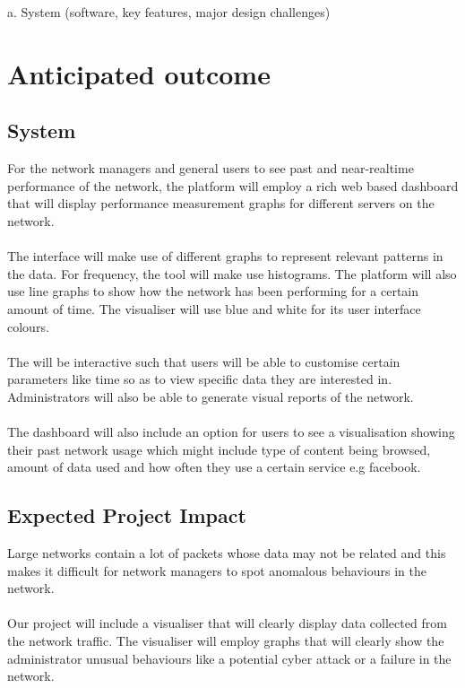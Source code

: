 a. System (software, key features, major design challenges) 

\section{Anticipated outcome}
\subsection{System}
For the network managers and general users to see past and near-realtime performance of the network, the platform will employ a rich web based dashboard that will display performance measurement graphs for different servers on the network.
\paragraph{}
The interface will make use of different graphs to represent relevant patterns in the data. For frequency, the tool will make use histograms. The platform will also use line graphs to show how the network has been performing for a certain amount of time. The visualiser will use blue and white for its user interface colours.
\paragraph{}
The will be interactive such that users will be able to customise certain parameters like time so as to view specific data they are interested in. Administrators will also be able to generate visual reports of the network.
\paragraph{}
The dashboard will also include an option for users to see a visualisation showing their past network usage which might include type of content being browsed, amount of data used and how often they use a certain service e.g facebook.

\subsection{Expected Project Impact}
Large networks contain a lot of packets whose data may not be related and this makes it difficult for network managers to spot anomalous behaviours in the network.
\paragraph{}
Our project will include a visualiser that will clearly display data collected from the network traffic. The visualiser will employ graphs that will clearly show the administrator unusual behaviours like a potential cyber attack or a failure in the network.

